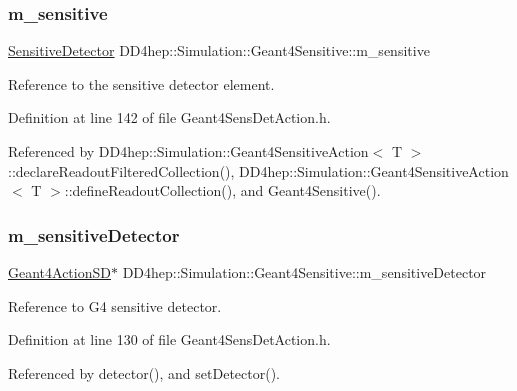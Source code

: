 \subsubsection{\texorpdfstring{m\+\_\+sensitive}{m\_sensitive}}
{\footnotesize\ttfamily \hyperlink{class_d_d4hep_1_1_simulation_1_1_geant4_sensitive_a985a23f6592b3ab41b9aa45e47fbc9ea}{Sensitive\+Detector} D\+D4hep\+::\+Simulation\+::\+Geant4\+Sensitive\+::m\+\_\+sensitive\hspace{0.3cm}{\ttfamily [protected]}}



Reference to the sensitive detector element. 



Definition at line 142 of file Geant4\+Sens\+Det\+Action.\+h.



Referenced by D\+D4hep\+::\+Simulation\+::\+Geant4\+Sensitive\+Action$<$ T $>$\+::declare\+Readout\+Filtered\+Collection(), D\+D4hep\+::\+Simulation\+::\+Geant4\+Sensitive\+Action$<$ T $>$\+::define\+Readout\+Collection(), and Geant4\+Sensitive().

\hypertarget{class_d_d4hep_1_1_simulation_1_1_geant4_sensitive_afc56b9a8666f9fe594516436f7fdd4e0}{}\label{class_d_d4hep_1_1_simulation_1_1_geant4_sensitive_afc56b9a8666f9fe594516436f7fdd4e0} 
\subsubsection{\texorpdfstring{m\+\_\+sensitive\+Detector}{m\_sensitiveDetector}}
{\footnotesize\ttfamily \hyperlink{class_d_d4hep_1_1_simulation_1_1_geant4_action_s_d}{Geant4\+Action\+SD}$\ast$ D\+D4hep\+::\+Simulation\+::\+Geant4\+Sensitive\+::m\+\_\+sensitive\+Detector\hspace{0.3cm}{\ttfamily [private]}}



Reference to G4 sensitive detector. 



Definition at line 130 of file Geant4\+Sens\+Det\+Action.\+h.



Referenced by detector(), and set\+Detector().

